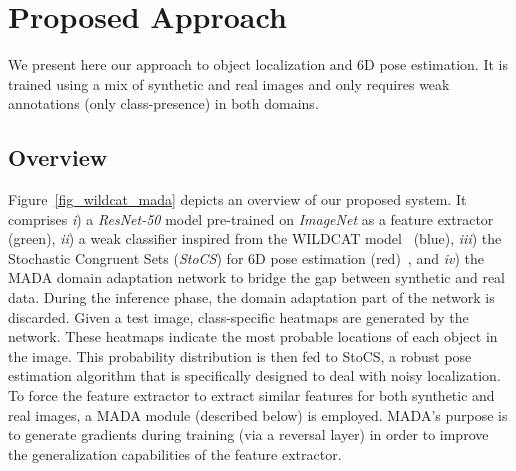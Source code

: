 \documentclass[letterpaper, 10 pt, conference]{ieeeconf}  %
\newcommand{\phil}[1]{\textcolor{blue}{#1}}
\begin{document}
\section{Proposed Approach}\label{sec:approach}
We present here our approach to object localization and 6D pose estimation. It is trained using a mix of synthetic and real images and only requires weak annotations (only class-presence) in both domains. 

\vspace{-0.55cm}\subsection{Overview}%

Figure~\ref{fig_wildcat_mada} depicts an overview of our proposed system. It comprises {\it i}) a {\it ResNet-50} model pre-trained on {\it ImageNet} as a feature extractor (green), {\it ii}) a weak classifier inspired from the WILDCAT model~\cite{durand2017wildcat} (blue), {\it iii}) the Stochastic Congruent Sets ({\it StoCS}) for 6D pose estimation (red)~\cite{mitash2018robust}, and {\it iv}) the MADA domain adaptation network to bridge the gap between synthetic and real data. %
During the inference phase, the domain adaptation part of the network is discarded. Given a test image, class-specific heatmaps are generated by the network. These heatmaps indicate the most probable locations of each object in the image. This probability distribution is then fed to StoCS, a robust pose estimation algorithm that is specifically designed to deal with noisy localization.
To force the feature extractor to extract similar features for both synthetic and real images, a MADA module (described below) is employed.
MADA's purpose is to generate gradients during training (via a reversal layer) in order to improve the generalization capabilities of the feature extractor. 
\end{document}
